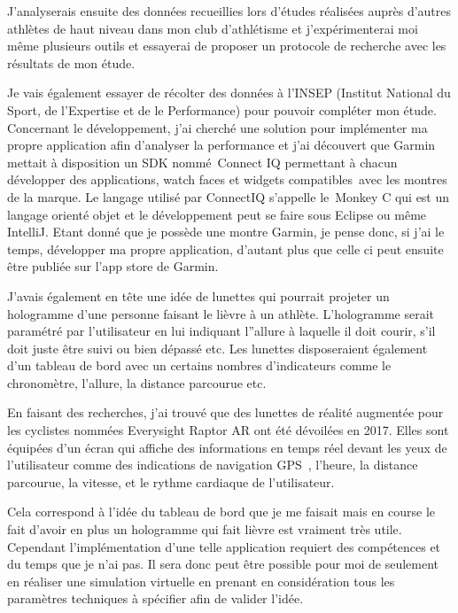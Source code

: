 J'analyserais ensuite des données recueillies lors d'études réalisées auprès d'autres athlètes de haut niveau dans mon club d’athlétisme et j'expérimenterai moi même plusieurs outils et essayerai de proposer un protocole de recherche avec les résultats de mon étude.

Je vais également essayer de récolter des données à l'INSEP (Institut National du Sport, de l'Expertise et de le Performance) pour pouvoir compléter mon étude.\\

Concernant le développement, j’ai cherché une solution pour implémenter ma propre application afin d'analyser la performance et j’ai découvert que Garmin mettait à disposition un SDK nommé Connect IQ permettant à chacun développer des applications, watch faces et widgets compatibles avec les montres de la marque. Le langage utilisé par ConnectIQ s’appelle le Monkey C qui est un langage orienté objet et le développement peut se faire sous Eclipse ou même IntelliJ.
Etant donné que je possède une montre Garmin, je pense donc, si j'ai le temps, développer ma propre application, d'autant plus que celle ci peut ensuite être publiée sur l'app store de Garmin.

J'avais également en tête une idée de lunettes qui pourrait projeter un hologramme d'une personne faisant le lièvre à un athlète. L'hologramme serait paramétré par l'utilisateur en lui indiquant l''allure à laquelle il doit courir, s'il doit juste être suivi ou bien dépassé etc. Les lunettes disposeraient  également d'un tableau de bord avec un certains nombres d'indicateurs comme le chronomètre, l'allure, la distance parcourue etc.

En faisant des recherches, j'ai trouvé que des lunettes de réalité augmentée pour les cyclistes nommées Everysight Raptor AR ont été dévoilées en 2017. Elles sont équipées d'un écran qui affiche des informations en temps réel  devant les yeux de l'utilisateur comme des indications de navigation GPS , l’heure, la distance parcourue, la vitesse, et le rythme cardiaque de l’utilisateur. 

Cela correspond à l'idée du tableau de bord que  je me faisait mais en course le fait d'avoir en plus un hologramme qui fait lièvre est vraiment très utile. Cependant l'implémentation d'une telle application requiert des compétences et du temps que je n'ai pas. Il sera donc peut être possible pour moi de seulement en réaliser une simulation virtuelle en prenant en considération tous les paramètres techniques à spécifier afin de valider l'idée.



        
